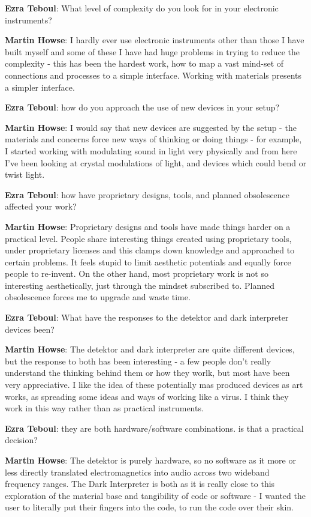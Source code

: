\textbf{Ezra Teboul}: What level of complexity do you look for in your electronic
instruments?

\textbf{Martin Howse}: I hardly ever use electronic instruments other than those I have
built myself and some of these I have had huge problems in trying to reduce the
complexity - this has been the hardest work, how to map a vast mind-set of connections
and processes to a simple interface. Working with materials presents a simpler interface.

\textbf{Ezra Teboul}: how do you approach the use of new devices in your setup?

\textbf{Martin Howse}: I would say that new devices are suggested by the setup - the
materials and concerns force new ways of thinking or doing things - for example, I
started working with modulating sound in light very physically and from here I've been
looking at crystal modulations of light, and devices which could bend or twist light.

\textbf{Ezra Teboul}: how have proprietary designs, tools, and planned obsolescence
affected your work?

\textbf{Martin Howse}: Proprietary designs and tools have made things harder on a
practical level. People share interesting things created using proprietary tools, under
proprietary licenses and this clamps down knowledge and approached to certain problems.
It feels stupid to limit aesthetic potentials and equally force people to re-invent. On
the other hand, most proprietary work is not so interesting aesthetically, just through
the mindset subscribed to. Planned obsolescence forces me to upgrade and waste time.

\textbf{Ezra Teboul}: What have the responses to the detektor and dark interpreter
devices been?

\textbf{Martin Howse}: The detektor and dark interpreter are quite different devices,
but the response to both has been interesting - a few people don't really understand the
thinking behind them or how they worlk, but most have been very appreciative. I like the
idea of these potentially mas produced devices as art works, as spreading some ideas and
ways of working like a virus. I think they work in this way rather than as practical
instruments.

\textbf{Ezra Teboul}: they are both hardware/software combinations. is that a practical
decision?

\textbf{Martin Howse}: The detektor is purely hardware, so no software as it more or
less directly translated electromagnetics into audio across two wideband frequency
ranges. The Dark Interpreter is both as it is really close to this exploration of the
material base and tangibility of code or software - I wanted the user to literally put
their fingers into the code, to run the code over their skin.

